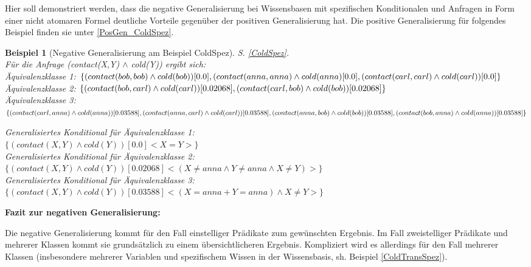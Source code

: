 \documentclass[a4paper, 11pt]{book}
\newtheorem{Bsp}{Beispiel}[section]
\begin{document}
Hier soll demonstriert werden, dass die negative Generalisierung bei Wissensbasen mit spezifischen Konditionalen und Anfragen in Form einer nicht atomaren Formel deutliche Vorteile gegenüber der positiven Generalisierung hat. Die positive Generalisierung für folgendes Beispiel finden sie unter \ref{PosGen_ColdSpez}. 
\begin{Bsp}[Negative Generalisierung am Beispiel ColdSpez]
	 S. \ref{ColdSpez}.\\
	Für die Anfrage (contact(X,Y) $\land$ cold(Y)) ergibt sich:\\
	
	\noindent
	Äquivalenzklasse 1: $  \{(contact(bob,bob) \land cold(bob))[0.0], (contact(anna,anna) \land\\ cold(anna)[0.0],\\ (contact(carl,carl) \land cold(carl))[0.0] \} $\\
	Äquivalenzklasse 2: $ \{(contact(bob,carl) \land cold(carl))[0.02068],\\ (contact(carl,bob) \land cold(bob))[0.02068] \}$\\
	Äquivalenzklasse 3:  $ \{(contact(carl,anna) \land cold(anna))[0.03588], \\ (contact(anna, carl) \land cold(carl))[0.03588], (contact(anna,bob) \land cold(bob))[0.03588],\\ (contact(bob,anna) \land cold(anna))[0.03588]\}$
	
	\noindent
		Generalisiertes Konditional für Äquivalenzklasse 1:\\ $ \{ (contact(X,Y) \land cold(Y))[0.0]<X=Y>\} $\\
	Generalisiertes Konditional für Äquivalenzklasse 2:\\ $ \{ (contact(X,Y) \land cold(Y))[0.02068]<(X \neq anna \land Y\neq anna \land X \neq Y)>\} $\\
		Generalisiertes Konditional für Äquivalenzklasse 3: \\$ \{ (contact(X,Y) \land cold(Y))[0.03588]<(X=anna + Y=anna) \land  X \neq Y>\} $\\
	
	
\end{Bsp}

\textbf{{\large Fazit zur negativen Generalisierung:}} \label{Fazit neg Gen} 

\noindent
Die negative Generalisierung kommt für den Fall einstelliger Prädikate zum gewünschten Ergebnis. Im Fall zweistelliger Prädikate und mehrerer Klassen kommt sie grundsätzlich zu einem übersichtlicheren Ergebnis. Kompliziert wird es allerdings für den Fall mehrerer Klassen (insbesondere mehrerer Variablen und spezifischem Wissen in der Wissensbasis, sh. Beispiel \ref{ColdTransSpez}).
\end{document}
